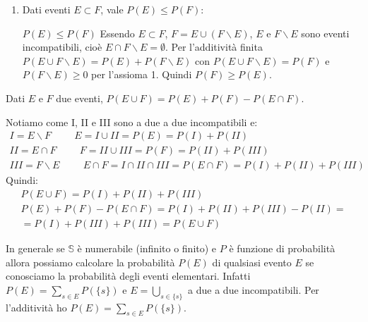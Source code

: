 \begin{enumerate}
    \begin{Demonstration}{$P(E^c)=1-P(E)$}{}
        Osservo che $E$ ed $E^c$ sono eventi incompatibili, cioè $E\cap E^c=\emptyset$. Per l'additività finita ho che $P(E\cup E^c)=P(E)+P(E^c)$. Però $E\cup E^c=\mathbb{S}$ e $P(\mathbb{S})=1$ per il secondo assioma.
        \begin{align*}
            1=P(\mathbb{S})=P(E\cup E^c)=P(E)+P(E^c)\\
            1=P(E)+P(E^c)\hspace{1cm}P(E^c)=1-P(E)
        \end{align*}
    \end{Demonstration}

    \item Dati eventi $E\subset F$, vale $P(E)\leq P(F)$:

    \begin{Demonstration}{$P(E)\leq P(F)$}{}
            Essendo $E\subset F$, $F=E\cup(F\backslash E)$, $E$ e $F\backslash E$ sono eventi incompatibili, cioè $E\cap F\backslash E=\emptyset$. Per l'additività finita $P(E\cup F\backslash E)=P(E)+P(F\backslash E)$ con $P(E\cup F\backslash E)=P(F)$ e $P(F\backslash E)\geq0$ per l'assioma 1. Quindi $P(F)\geq P(E)$.
    \end{Demonstration}
\end{enumerate}

Dati $E$ e $F$ due eventi, $P(E\cup F)=P(E)+P(F)-P(E\cap F)$.
\begin{Demonstration}{}{}
    Notiamo come I, II e III sono a due a due incompatibili e:
    \begin{gather*}
        I=E\backslash F\hspace{1cm}E=I\cup II=P(E)=P(I)+P(II)\\
        II=E\cap F\hspace{1cm}F=II\cup III=P(F)=P(II)+P(III)\\
        III=F\backslash E\hspace{1cm}E\cap F=I\cap II\cap III=P(E\cap F)=P(I)+P(II)+P(III)
    \end{gather*}
    Quindi:
    \begin{gather*}
        P(E\cup F)=P(I)+P(II)+P(III)\\
        P(E)+P(F)-P(E\cap F)=P(I)+P(II)+P(III)-P(II)=\\
        = P(I)+P(III)+P(III)=P(E\cup F)
    \end{gather*}
\end{Demonstration}


In generale se $\mathbb{S}$ è numerabile (infinito o finito) e $P$ è funzione di probabilità allora possiamo calcolare la probabilità $P(E)$ di qualsiasi evento $E$ se conosciamo la probabilità degli eventi elementari. Infatti $P(E)=\sum_{s\in E}P(\{s\})$ e $E=\bigcup_{s\in\{s\}}$ a due a due incompatibili. Per l'additività ho $P(E)=\sum_{s\in E}P(\{s\})$.


